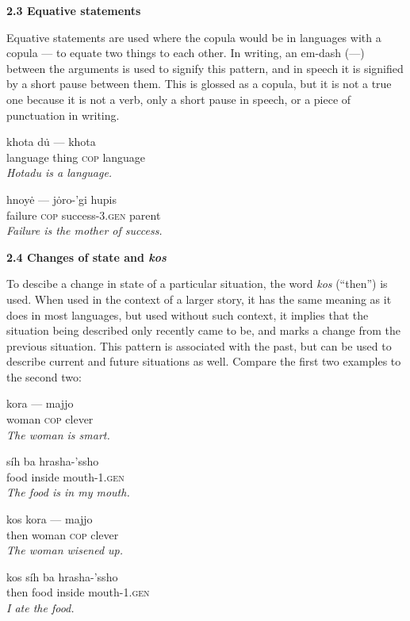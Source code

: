 \documentclass{article}[10pt]
\begin{document}
{\bf 2.3 Equative statements}

Equative statements are used where the copula would be in languages with a copula --- to equate two things to each other. In writing, an em-dash (---) between the arguments is used to signify this pattern, and in speech it is signified by a short pause between them. This is glossed as a copula, but it is not a true one because it is not a verb, only a short pause in speech, or a piece of punctuation in writing.
\begin{exe}
\ex
\gll khota d\.{u} --- khota\\
language thing \textsc{cop} language\\
\trans \emph{Hotadu is a language.}

\ex
\gll hnoy\.{e} --- j\.{o}ro-'gi hupis\\
failure \textsc{cop} success-\textsc{3.gen} parent\\
\trans \emph{Failure is the mother of success.}
\end{exe}

{\bf 2.4 Changes of state and \emph{kos}}

To descibe a change in state of a particular situation, the word \emph{kos} (``then'') is used. When used in the context of a larger story, it has the same meaning as it does in most languages, but used without such context, it implies that the situation being described only recently came to be, and marks a change from the previous situation. This pattern is associated with the past, but can be used to describe current and future situations as well. Compare the first two examples to the second two:
\begin{exe}
\ex
\gll kora --- majjo\\
woman \textsc{cop} clever\\
\trans \emph{The woman is smart.}

\ex
\gll s\'{i}h ba hrasha-'ssho\\
food inside mouth-\textsc{1.gen}\\
\trans \emph{The food is in my mouth.}

\ex
\gll kos kora --- majjo\\
then woman \textsc{cop} clever\\
\trans \emph{The woman wisened up.}

\ex
\gll kos s\'{i}h ba hrasha-'ssho\\
then food inside mouth-\textsc{1.gen}\\
\trans \emph{I ate the food.}
\end{exe}
\end{document}
